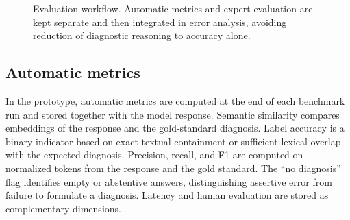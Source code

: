 \documentclass[11pt,a4paper]{article}
\begin{document}
\begin{figure}[htbp]
\centering
{}
\caption{Evaluation workflow. Automatic metrics and expert evaluation are kept separate and then integrated in error analysis, avoiding reduction of diagnostic reasoning to accuracy alone.}
\label{fig:evaluation-workflow-en}
\end{figure}

\subsection{Automatic metrics}
In the prototype, automatic metrics are computed at the end of each benchmark run and stored together with the model response. Semantic similarity compares embeddings of the response and the gold-standard diagnosis. Label accuracy is a binary indicator based on exact textual containment or sufficient lexical overlap with the expected diagnosis. Precision, recall, and F1 are computed on normalized tokens from the response and the gold standard. The ``no diagnosis'' flag identifies empty or abstentive answers, distinguishing assertive error from failure to formulate a diagnosis. Latency and human evaluation are stored as complementary dimensions.
\end{document}
